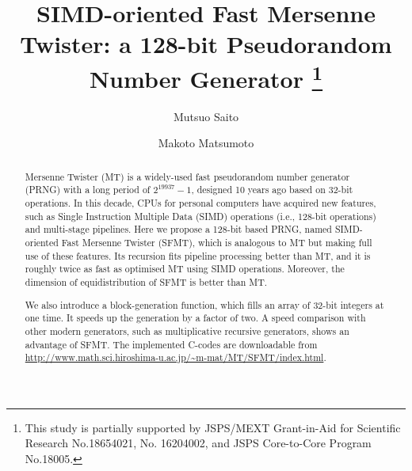\documentclass{svmult}
\begin{document}
\title*{SIMD-oriented Fast Mersenne Twister:
a 128-bit Pseudorandom Number Generator
\thanks{This study is partially supported by JSPS/MEXT
Grant-in-Aid for Scientific Research No.18654021, No. 16204002,
and JSPS Core-to-Core Program No.18005.}}
            

\author{Mutsuo Saito\and
Makoto Matsumoto}

\maketitle
            
\begin{abstract} 
Mersenne Twister (MT)
is a widely-used fast pseudorandom number generator (PRNG)
with a long period of $2^{19937}-1$,
designed 10 years ago based on 32-bit operations.
In this decade, CPUs for personal computers
have acquired new features, such as 
Single Instruction Multiple Data (SIMD) operations
(i.e., 128-bit operations) and multi-stage pipelines.
Here we propose a 128-bit based 
PRNG, named SIMD-oriented Fast Mersenne Twister
(SFMT), which is analogous to MT but making full use
of these features. Its recursion fits pipeline processing
better than MT, and it is roughly twice as fast as 
optimised MT using SIMD operations.
Moreover, the dimension of equidistribution of SFMT
is better than MT. 

We also introduce 
a block-generation function, 
which fills an array of 32-bit integers at one time.
It speeds up the generation by a factor of two. 
A speed comparison with other modern generators, 
such as multiplicative recursive generators,
shows an advantage of SFMT. The implemented 
C-codes are downloadable from 
\url{http://www.math.sci.hiroshima-u.ac.jp/~m-mat/MT/SFMT/index.html}.
\end{abstract}
            


\end{document}
